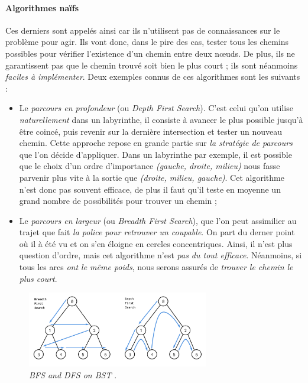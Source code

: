 \paragraph{Algorithmes naïfs} Ces derniers sont appelés ainsi car ils n'utilisent pas de connaissances sur le problème
pour agir. Ils vont donc, dans le pire des cas, tester tous les chemins possibles pour vérifier l'existence d'un chemin
entre deux n\oe{}uds. De plus, ils ne garantissent pas que le chemin trouvé soit bien le plus court ; ils sont 
néanmoins \emph{faciles à implémenter}. Deux exemples connus de ces algorithmes sont les suivants :
\begin{itemize}
    \item Le \emph{parcours en profondeur} (ou \emph{Depth First Search}). C'est celui qu'on utilise \emph{naturellement} dans un labyrinthe, il consiste
    à avancer le plus possible jusqu'à être coincé, puis revenir sur la dernière intersection et tester un nouveau chemin.
    Cette approche repose en grande partie sur \emph{la stratégie de parcours} que l'on décide d'appliquer. Dans un labyrinthe
    par exemple, il est possible que le choix d'un ordre d'importance \emph{(gauche, droite, milieu)} nous fasse parvenir plus vite
    à la sortie que \emph{(droite, milieu, gauche)}. Cet algorithme n'est donc pas souvent efficace, de plus il faut qu'il teste
    en moyenne un grand nombre de possibilités pour trouver un chemin ;
    \item Le \emph{parcours en largeur} (ou \emph{Breadth First Search}), que l'on peut assimilier au trajet que fait \emph{la police pour retrouver un
    coupable}. On part du derner point où il à été vu et on s'en éloigne en cercles concentriques. Ainsi, il n'est plus
    question d'ordre, mais cet algorithme n'est \emph{pas du tout efficace}. Néanmoins, si tous les arcs \emph{ont le
    même poids}, nous serons assurés de \emph{trouver le chemin le plus court}.
\end{itemize}

\begin{figure}[ht]
    \centering
    \includegraphics[width=300px]{chapters/03/images/bfs-dfs-bst.png}
    \caption{\label{bfs-dfs}\emph{BFS and DFS on BST} \cite{Algorithm0}.}
\end{figure}


